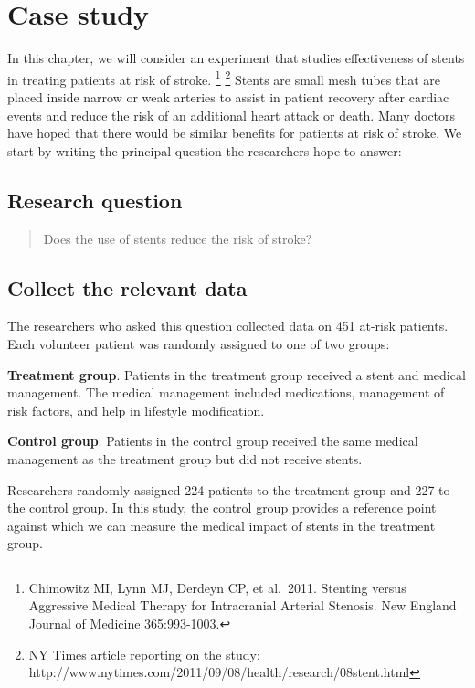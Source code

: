 \documentclass[
  letterpaper,
  DIV=11,
  numbers=noendperiod]{scrreprt}
\begin{document}
\section{Case study}\label{case-study}

In this chapter, we will consider an experiment that studies
effectiveness of stents in treating patients at risk of stroke.
\footnote{Chimowitz MI, Lynn MJ, Derdeyn CP, et al.~2011. Stenting
  versus Aggressive Medical Therapy for Intracranial Arterial Stenosis.
  New England Journal of Medicine 365:993-1003.} \footnote{NY Times
  article reporting on the study:
  http://www.nytimes.com/2011/09/08/health/research/08stent.html} Stents
are small mesh tubes that are placed inside narrow or weak arteries to
assist in patient recovery after cardiac events and reduce the risk of
an additional heart attack or death. Many doctors have hoped that there
would be similar benefits for patients at risk of stroke. We start by
writing the principal question the researchers hope to answer:

\subsection{Research question}\label{research-question}

\begin{quote}
Does the use of stents reduce the risk of stroke?
\end{quote}

\subsection{Collect the relevant data}\label{collect-the-relevant-data}

The researchers who asked this question collected data on 451 at-risk
patients. Each volunteer patient was randomly assigned to one of two
groups:

\textbf{Treatment group}. Patients in the treatment group received a
stent and medical management. The medical management included
medications, management of risk factors, and help in lifestyle
modification.

\textbf{Control group}. Patients in the control group received the same
medical management as the treatment group but did not receive stents.

Researchers randomly assigned 224 patients to the treatment group and
227 to the control group. In this study, the control group provides a
reference point against which we can measure the medical impact of
stents in the treatment group.
\end{document}
